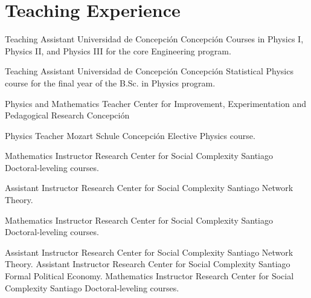 \section{Teaching Experience}

        {Teaching Assistant}
        {Universidad de Concepción}
        {Concepción} 
        {Courses in Physics I, Physics II, and Physics III for the core Engineering program.}   %
        {}

        {Teaching Assistant}
        {Universidad de Concepción}
        {Concepción}
        {Statistical Physics course for the final year of the B.Sc. in Physics program.}  %
        {}


        {Physics and Mathematics Teacher}
        {Center for Improvement, Experimentation and Pedagogical Research}
        {Concepción}
        {}   %
        {}

        {Physics Teacher}
        {Mozart Schule}
        {Concepción}
        {Elective Physics course.}   %
        {}
        
        {Mathematics Instructor}
        {Research Center for Social Complexity}
        {Santiago}
        {\newline Doctoral-leveling courses.}   %
        {}

        {Assistant Instructor}
        {Research Center for Social Complexity}
        {Santiago}
        {\newline Network Theory.}   %
        {}

        {Mathematics Instructor}
        {Research Center for Social Complexity}
        {Santiago}
        {\newline Doctoral-leveling courses.}   %
        {}

        {Assistant Instructor}
        {Research Center for Social Complexity}
        {Santiago}
        {\newline Network Theory.}   %
        {}
        {Assistant Instructor}
        {Research Center for Social Complexity}
        {Santiago}
        {\newline Formal Political Economy.}   %
        {}
        {Mathematics Instructor}
        {Research Center for Social Complexity}
        {Santiago}
        {\newline Doctoral-leveling courses.}   %
        {}


